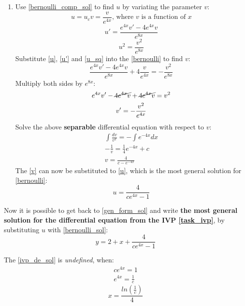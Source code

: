 \documentclass[12pt,a4paper,titlepage,twoside]{article}
\begin{document}
\begin{enumerate}
\begin{enumerate}
      \item Use \eqref{bernoulli_comp_sol} to find $u$ by variating the parameter $v$:
      \begin{equation} \label{u}
        u = u_cv = \frac{v}{e^{4x}} \text{, where $v$ is a function of $x$}
      \end{equation}
      \begin{equation} \label{u'}
        u' = \frac{e^{4x}v' - 4e^{4x}v}{e^{8x}}
      \end{equation}
      \begin{equation} \label{u_sq}
        u^2 = \frac{v^2}{e^{8x}}
      \end{equation}
      Substitute \eqref{u}, \eqref{u'} and \eqref{u_sq} into the \eqref{bernoulli} to find $v$:
      \begin{equation*}
        \frac{e^{4x}v' - 4e^{4x}v}{e^{8x}} + 4\frac{v}{e^{4x}} = -\frac{v^2}{e^{8x}}
      \end{equation*}
      Multiply both sides by $e^{8x}$:
      \begin{gather*}
        e^{4x}v' - \cancel{4e^{4x}v} + \cancel{4e^{4x}v} = v^2\\
        v' = -\frac{v^2}{e^{4x}}
      \end{gather*}
      Solve the above \textbf{separable} differential equation with respect to $v$:
      \begin{gather}
        \int \frac{dv}{v^2} = - \int e^{-4x} dx \nonumber \\
        - \frac{1}{v} = \frac{1}{4}e^{-4x} + c \nonumber \\
        v = \frac{4}{c - e^{-4x}} \label{v}
      \end{gather}
      The \eqref{v} can now be substituted to \eqref{u}, which is the most general solution for \eqref{bernoulli}:
      \begin{equation} \label{bernoulli_sol}
        u = \frac{4}{ce^{4x} - 1}
      \end{equation}
    \end{enumerate}

    Now it is possible to get back to \eqref{gen_form_sol} and write \textbf{the most general solution for the differential equation from the IVP \eqref{task_ivp}}, by substituting $u$ with \eqref{bernoulli_sol}:
    \begin{equation} \label{ivp_de_sol}
      y = 2 + x + \frac{4}{ce^{4x} - 1}
    \end{equation}

    The \eqref{ivp_de_sol} is \textit{undefined}, when:
    \begin{gather*}
      ce^{4x} = 1 \\
      e^{4x} = \frac{1}{c}
    \end{gather*}
    \begin{equation} \label{undefined_point}
      x = \frac{ln(\frac{1}{c})}{4}
    \end{equation}


\end{enumerate}
\end{document}
